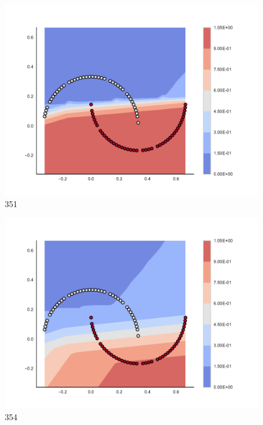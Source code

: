 \begin{subfigure}[b]{0.09\textwidth}
    \includegraphics[clip, trim=2.35cm 1.75cm 4.5cm 0cm,width=\textwidth]{img/convergence/351.pdf}
    \caption{351}
    \label{fig:convergence_351}
\end{subfigure}
%
\begin{subfigure}[b]{0.09\textwidth}
    \includegraphics[clip, trim=2.35cm 1.75cm 4.5cm 0cm,width=\textwidth]{img/convergence/354.pdf}
    \caption{354}
    \label{fig:convergence_354}
\end{subfigure}
%
